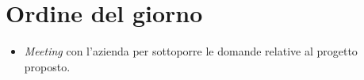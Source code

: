 \section{Ordine del giorno}
\begin{itemize}
    \item \textit{Meeting} con l'azienda per sottoporre le domande relative al progetto proposto.
\end{itemize}
